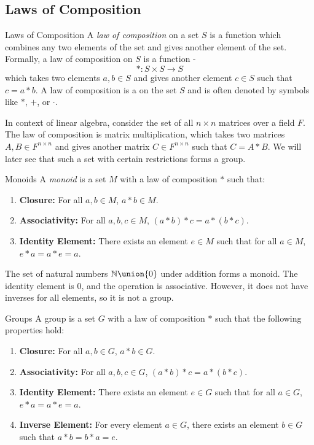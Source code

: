 \documentclass[openany]{book}
\begin{document}
\subsection{Laws of Composition}
\begin{mydefinition}{Laws of Composition}
A \emph{law of composition} on a set $S$ is a function which combines any two elements of the set and gives another element of the set. Formally, a law of composition on $S$ is a function - 
$$*: S \times S \to S$$
which takes two elements $a, b \in S$ and gives another element $c \in S$ such that $c = a * b$.
A law of composition is a  on the set $S$ and is often denoted by symbols like $*$, $+$, or $\cdot$.
\end{mydefinition}
\begin{example}
    In context of linear algebra, consider the set of all $n \times n$ matrices over a field $F$. The law of composition is matrix multiplication, which takes two matrices $A, B \in F^{n \times n}$ and gives another matrix $C \in F^{n \times n}$ such that $C = A * B$. We will later see that such a set with certain restrictions forms a group. 
\end{example}
\begin{mydefinition}{Monoids}
A \emph{monoid} is a set $M$ with a law of composition $*$ such that:
\begin{enumerate}
    \item \textbf{Closure:} For all $a, b \in M$, $a * b \in M$.
    \item \textbf{Associativity:} For all $a, b, c \in M$, $(a * b) * c = a * (b * c)$.
    \item \textbf{Identity Element:} There exists an element $e \in M$ such that for all $a \in M$, $e * a = a * e = a$.
\end{enumerate}
\end{mydefinition}
\begin{example}
    The set of natural numbers $\mathbb{N}\union\{0\}$ under addition forms a monoid. The identity element is $0$, and the operation is associative. However, it does not have inverses for all elements, so it is not a group.
\end{example}
\begin{mydefinition}{Groups}
    A group is a set $G$ with a law of composition $*$ such that the following properties hold:
    \begin{enumerate}
        \item \textbf{Closure:} For all $a, b \in G$, $a * b \in G$.
        \item \textbf{Associativity:} For all $a, b, c \in G$, $(a * b) * c = a * (b * c)$.
        \item \textbf{Identity Element:} There exists an element $e \in G$ such that for all $a \in G$, $e * a = a * e = a$.
        \item \textbf{Inverse Element:} For every element $a \in G$, there exists an element $b \in G$ such that $a * b = b * a = e$.
    \end{enumerate}
\end{mydefinition}
\end{document}
